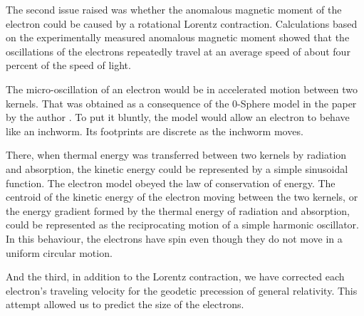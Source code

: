 \documentclass[%
 reprint,
 amsmath,amssymb,
 aps,
]{revtex4-1}
\numberwithin{equation}{section}%
\begin{document}
The second issue raised was whether the anomalous magnetic moment of the electron could be caused by a rotational Lorentz contraction. Calculations based on the experimentally measured anomalous magnetic moment showed that the oscillations of the electrons repeatedly travel at an average speed of about four percent of the speed of light.


The micro-oscillation of an electron would be in accelerated motion between two kernels. That was obtained as a consequence of the 0-Sphere model in the paper by the author \cite{Hanamura1}. To put it bluntly, the model would allow an electron to behave like an inchworm. Its footprints are discrete as the inchworm moves.

There, when thermal energy was transferred between two kernels by radiation and absorption, the kinetic energy could be represented by a simple sinusoidal function. The electron model obeyed the law of conservation of energy. The centroid of the kinetic energy of the electron moving between the two kernels, or the energy gradient formed by the thermal energy of radiation and absorption, could be represented as the reciprocating motion of a simple harmonic oscillator. In this behaviour, the electrons have spin even though they do not move in a uniform circular motion.


And the third, in addition to the Lorentz contraction, we have corrected each electron's traveling velocity for the geodetic precession of general relativity. This attempt allowed us to predict the size of the electrons.

\end{document}
